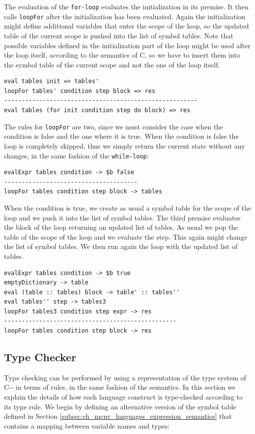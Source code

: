 \noindent
The evaluation of the \texttt{for-loop} evaluates the initialization in its premise. It then calls \texttt{loopFor} after the initialization has been evaluated. Again the initialization might define additional variables that enter the scope of the loop, so the updated table of the current scope is pushed into the list of symbol tables. Note that possible variables defined in the initialization part of the loop might be used after the loop itself, according to the semantics of C, so we have to insert them into the symbol table of the current scope and not the one of the loop itself.

\begin{lstlisting}
eval tables init => tables'
loopFor tables' condition step block => res
-------------------------------------------------------
eval tables (for init condition step do block) => res
\end{lstlisting}

The rules for \texttt{loopFor} are two, since we must consider the case when the condition is false and the one where it is true. When the condition is false the loop is completely skipped, thus we simply return the current state without any changes, in the same fashion of the \texttt{while-loop}:

\begin{lstlisting}
evalExpr tables condition -> $b false
--------------------------------------
loopFor tables condition step block -> tables
\end{lstlisting}

\noindent
When the condition is true, we create as usual a symbol table for the scope of the loop and we push it into the list of symbol tables. The third premise evaluates the block of the loop returning an updated list of tables. As usual we pop the table of the scope of the loop and we evaluate the step. This again might change the list of symbol tables. We then run again the loop with the updated list of tables.

\begin{lstlisting}
evalExpr tables condition -> $b true
emptyDictionary -> table
eval (table :: tables) block -> table' :: tables''
eval tables'' step -> tables3
loopFor tables3 condition step expr -> res 
-------------------------------------------------
loopFor tables condition step block -> res
\end{lstlisting}

\subsection{Type Checker}
\label{subsec:ch_mcnv_languages_type_checking}
Type checking can be performed by using a representation of the type system of C-{}- in terms of rules, in the same fashion of the semantics. In this section we explain the details of how each language construct is type-checked according to its type rule. We begin by defining an alternative version of the symbol table defined in Section \ref{subsec:ch_mcnv_languages_expression_semantics} that contains a mapping between variable names and types:

